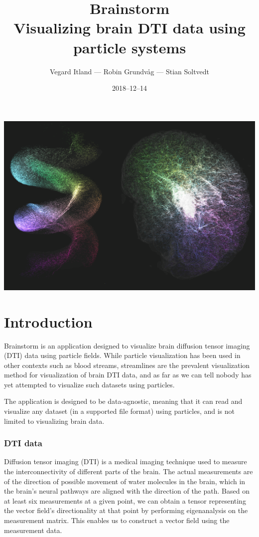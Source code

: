 \documentclass{article}
\title{%
Brainstorm\\
\large Visualizing brain DTI data using particle systems}
\author{Vegard Itland --- Robin Grundvåg --- Stian Soltvedt}
\date{2018--12--14}
\begin{document}
\maketitle
{}
\includegraphics[width=\textwidth]{brainstorm.png}

\newpage
\section*{Introduction}

Brainstorm is an application designed to visualize brain diffusion tensor imaging (DTI) data using particle fields. While particle visualization has been used in other contexts such as blood streams, streamlines are the prevalent visualization method for visualization of brain DTI data, and as far as we can tell nobody has yet attempted to visualize such datasets using particles.

The application is designed to be data-agnostic, meaning that it can read and visualize any dataset (in a supported file format) using particles, and is not limited to visualizing brain data.

\subsubsection*{DTI data}

Diffusion tensor imaging (DTI) is a medical imaging technique used to measure the interconnectivity of different parts of the brain. The actual measurements are of the direction of possible movement of water molecules in the brain, which in the brain's neural pathways are aligned with the direction of the path. Based on at least six measurements at a given point, we can obtain a tensor representing the vector field's directionality at that point by performing eigenanalysis on the measurement matrix. This enables us to construct a vector field using the measurement data.
\end{document}
